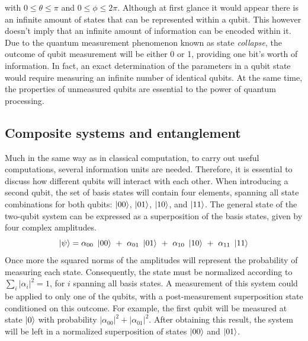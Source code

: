 with $0\leq \theta \leq \pi$ and $0\leq \phi \leq 2\pi$. Although at first glance it would appear there is an infinite amount of states that can be represented within a qubit. This however doesn't imply that an infinite amount of information can be encoded within it. Due to the quantum measurement phenomenon known as state \textit{collapse}, the outcome of qubit measurement will be either 0 or 1, providing one bit's worth of information. In fact, an exact determination of the parameters in a qubit state would require measuring an infinite number of identical qubits. At the same time, the properties of unmeasured qubits are essential to the power of quantum processing.

\subsection{Composite systems and entanglement}

Much in the same way as in classical computation, to carry out useful computations, several information units are needed. Therefore, it is essential to discuss how different qubits will interact with each other. When introducing a second qubit, the set of basis states will contain four elements, spanning all state combinations for both qubits: $\ket{00}$, $\ket{01}$, $\ket{10}$, and $\ket{11}$. The general state of the two-qubit system can be expressed as a superposition of the basis states, given by four complex amplitudes.
\begin{equation}
    \ket{\psi} = \alpha_{00}\ \ket{00}\ +\ \alpha_{01}\ \ket{01}\ + \ \alpha_{10}\ \ket{10}\ +\ \alpha_{11}\ \ket{11}
\end{equation}
Once more the squared norms of the amplitudes will represent the probability of measuring each state. Consequently, the state must be normalized according to $\sum_i |\alpha_i|^2 = 1$, for $i$ spanning all basis states. A measurement of this system could be applied to only one of the qubits, with a post-measurement superposition state conditioned on this outcome. For example, the first qubit will be measured at state $\ket{0}$ with probability $|\alpha_{00}|^2 + |\alpha_{01}|^2$. After obtaining this result, the system will be left in a normalized superposition of states $\ket{00}$ and $\ket{01}$.

